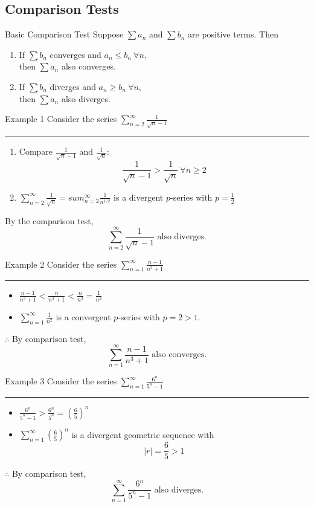 \documentclass[12pt,a4paper]{article}
\begin{document}
\subsection{Comparison Tests}
\begin{thm}{Basic Comparison Test}
	Suppose $\displaystyle\sum{a_n}$ and $\displaystyle\sum{b_n}$ are positive terms. Then
	\begin{enumerate}
		\item If $\displaystyle\sum{b_n}$ converges and $a_n\leq b_n\ \forall n$,\\
		then $\displaystyle\sum{a_n}$ also converges.
		\item 	If $\displaystyle\sum{b_n}$ diverges and $a_n\geq b_n\ \forall n$,\\
		then $\displaystyle\sum{a_n}$ also diverges.
	\end{enumerate}
\end{thm}
\begin{eg}{Example 1}
	Consider the series $\displaystyle\sum_{n=2}^\infty\frac{1}{\sqrt{n}-1}$	\\
	\noindent\rule[0.25\baselineskip]{\textwidth}{1pt}
	\begin{enumerate}
		\item Compare $\displaystyle\frac{1}{\sqrt{n}-1}$ and $\displaystyle\frac{1}{\sqrt{n}}$: 
		$$\frac{1}{\sqrt{n}-1}>\frac{1}{\sqrt{n}}\ \forall n\geq 2$$
		\item $\displaystyle\sum_{n=2}^\infty\frac{1}{\sqrt{n}}=sum_{n=2}^\infty\frac{1}{n^{1/2}}$ is a divergent $p$-series with $\displaystyle p=\frac{1}{2}$
	\end{enumerate}
	By the comparison test, 
	$$\sum_{n=2}^\infty\frac{1}{\sqrt{n}-1}\text{ also diverges.}$$
\end{eg}
\begin{eg}{Example 2}
	Consider the series $\displaystyle\sum_{n=1}^\infty\frac{n-1}{n^3+1}$\\
	\noindent\rule[0.25\baselineskip]{\textwidth}{1pt}
	\begin{itemize}
		\item $\displaystyle\frac{n-1}{n^3+1}<\frac{n}{n^3+1}<\frac{n}{n^3}=\frac{1}{n^2}$
		\item $\displaystyle\sum_{n=1}^\infty\frac{1}{n^2}$ is a convergent $p$-series with $p=2>1$.
	\end{itemize}
	$\therefore$ By comparison test,
	$$\sum_{n=1}^\infty\frac{n-1}{n^3+1}\text{ also converges.}$$
\end{eg}
\begin{eg}{Example 3}
	Consider the series $\displaystyle\sum_{n=1}^\infty\frac{6^n}{5^n-1}$\\	
	\noindent\rule[0.25\baselineskip]{\textwidth}{1pt}
	\begin{itemize}
		\item $\displaystyle\frac{6^n}{5^n-1}>\frac{6^n}{5^n}=\left(\frac{6}{5}\right)^n$
		\item $\displaystyle\sum_{n=1}^\infty\left(\frac{6}{5}\right)^n$ is a divergent geometric sequence with $$|r|=\frac{6}{5}>1$$
	\end{itemize}
	$\therefore$ By comparison test,
	$$\sum_{n=1}^\infty\frac{6^n}{5^n-1}\text{ also diverges.}$$
\end{eg}
\end{document}
